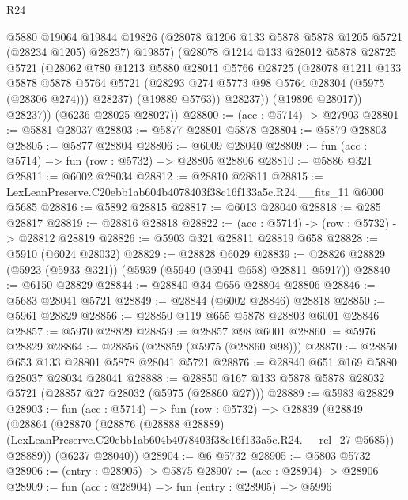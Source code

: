 \begin{lexlean}{R24}
\begin{coremodule}
                @5880
                @19064
                @19844
                @19826
                (@28078 @1206 @133 @5878 @5878 @1205 @5721 (@28234 @1205) @28237)
                @19857)
              (@28078
                @1214
                @133
                @28012
                @5878
                @28725
                @5721
                (@28062
                  @780
                  @1213
                  @5880
                  @28011
                  @5766
                  @28725
                  (@28078
                    @1211
                    @133
                    @5878
                    @5878
                    @5764
                    @5721
                    (@28293 @274 @5773 @98 @5764 @28304 (@5975 (@28306 @274)))
                    @28237)
                  (@19889 @5763))
                @28237))
            (@19896 @28017))
          @28237))
      (@6236 @28025 @28027))
@28800 := (acc : @5714) -> @27903
@28801 := @5881 @28037
@28803 := @5877 @28801 @5878
@28804 := @5879 @28803
@28805 := @5877 @28804
@28806 := @6009 @28040
@28809 := fun (acc : @5714) => fun (row : @5732) => @28805 @28806
@28810 := @5886 @321
@28811 := @6002 @28034
@28812 := @28810 @28811
@28815 := LexLeanPreserve.C20ebb1ab604b4078403f38c16f133a5c.R24.__fits_11 @6000 @5685
@28816 := @5892 @28815
@28817 := @6013 @28040
@28818 := @285 @28817
@28819 := @28816 @28818
@28822 := (acc : @5714) -> (row : @5732) -> @28812 @28819
@28826 := @5903 @321 @28811 @28819 @658
@28828 := @5910 (@6024 @28032)
@28829 := @28828 @6029
@28839 := @28826 @28829 (@5923 (@5933 @321)) (@5939 (@5940 (@5941 @658) @28811 @5917))
@28840 := @6150 @28829
@28844 := @28840 @34 @656 @28804 @28806
@28846 := @5683 @28041 @5721
@28849 := @28844 (@6002 @28846) @28818
@28850 := @5961 @28829
@28856 := @28850 @119 @655 @5878 @28803 @6001 @28846
@28857 := @5970 @28829
@28859 := @28857 @98 @6001
@28860 := @5976 @28829
@28864 := @28856 (@28859 (@5975 (@28860 @98)))
@28870 := @28850 @653 @133 @28801 @5878 @28041 @5721
@28876 := @28840 @651 @169 @5880 @28037 @28034 @28041
@28888 := @28850 @167 @133 @5878 @5878 @28032 @5721 (@28857 @27 @28032 (@5975 (@28860 @27)))
@28889 := @5983 @28829
@28903 := fun (acc : @5714) =>
  fun (row : @5732) =>
  @28839
    (@28849
      (@28864
        (@28870
          (@28876
            (@28888 @28889)
            (LexLeanPreserve.C20ebb1ab604b4078403f38c16f133a5c.R24.__rel_27 @5685))
          @28889))
      (@6237 @28040))
@28904 := @6 @5732
@28905 := @5803 @5732
@28906 := (entry : @28905) -> @5875
@28907 := (acc : @28904) -> @28906
@28909 := fun (acc : @28904) => fun (entry : @28905) => @5996

\end{coremodule}
\end{lexlean}
